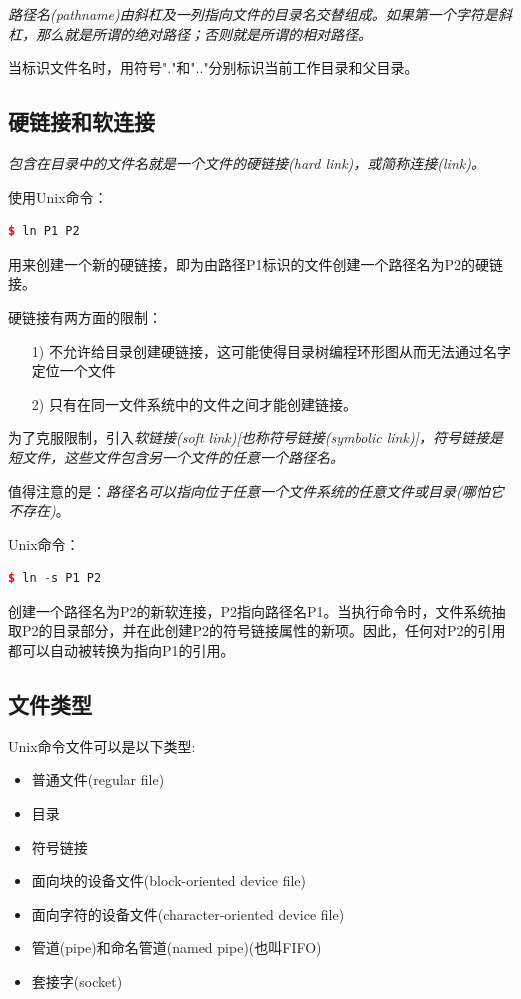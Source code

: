     \emph{路径名(pathname)由斜杠及一列指向文件的目录名交替组成。如果第一个字符是斜杠，那么就是所谓的绝对路径；否则就是所谓的相对路径。}

    当标识文件名时，用符号"."和".."分别标识当前工作目录和父目录。

\subsection{硬链接和软连接}

    \emph{包含在目录中的文件名就是一个文件的硬链接(hard link)，或简称连接(link)。}

    使用Unix命令：

\begin{lstlisting}[language=C++]
$ ln P1 P2
\end{lstlisting}

    用来创建一个新的硬链接，即为由路径P1标识的文件创建一个路径名为P2的硬链接。

    硬链接有两方面的限制：

\begin{itemize}
    \item [1)] 不允许给目录创建硬链接，这可能使得目录树编程环形图从而无法通过名字定位一个文件
    \item [2)] 只有在同一文件系统中的文件之间才能创建链接。
\end{itemize}

    为了克服限制，引入\emph{软链接(soft link)[也称符号链接(symbolic link)]，符号链接是短文件，这些文件包含另一个文件的任意一个路径名。}

    值得注意的是：\emph{路径名可以指向位于任意一个文件系统的任意文件或目录(哪怕它不存在)}。

    Unix命令：

\begin{lstlisting}[language=C++]
$ ln -s P1 P2
\end{lstlisting}

    创建一个路径名为P2的新软连接，P2指向路径名P1。当执行命令时，文件系统抽取P2的目录部分，并在此创建P2的符号链接属性的新项。因此，任何对P2的引用都可以自动被转换为指向P1的引用。

\subsection{文件类型}

    Unix命令文件可以是以下类型:

\begin{itemize}
    \item 普通文件(regular file)
    \item 目录
    \item 符号链接
    \item 面向块的设备文件(block-oriented device file)
    \item 面向字符的设备文件(character-oriented device file)
    \item 管道(pipe)和命名管道(named pipe)(也叫FIFO)
    \item 套接字(socket)
\end{itemize}

